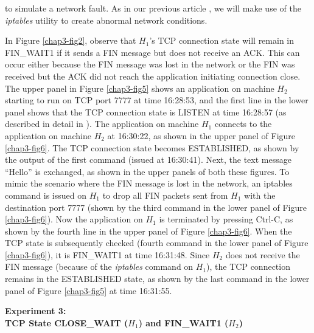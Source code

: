 \begin{multicols}{2}
\noindent
to simulate a network fault. As in our previous article \cite{chap3-key8}, we will make use of the \textit{iptables} utility to create abnormal network conditions.

In Figure \ref{chap3-fig2}, observe that $H_{1}$'s TCP connection state will remain in FIN\_WAIT1 if it sends a FIN message but does not receive an ACK. This can occur either because the FIN message was lost in the network or the FIN was received but the ACK did not reach the application initiating connection close. The upper panel in Figure \ref{chap3-fig5} shows an application on machine $H_{2}$ starting to run on TCP port 7777 at time 16:28:53, and the first line in the lower panel shows that the TCP connection state is LISTEN at time 16:28:57 (as described in detail in \cite{chap3-key8}). The application on machine $H_{1}$ connects to the application on machine $H_{2}$ at 16:30:22, as shown in the upper panel of Figure \ref{chap3-fig6}. The TCP connection state becomes ESTABLISHED, as shown by the output of the first command (issued at 16:30:41). Next, the text message ``Hello'' is exchanged, as shown in the upper panels of both these figures. To mimic the scenario where the FIN message is lost in the network, an iptables command is issued on $H_{1}$ to drop all FIN packets sent from $H_{1}$ with the destination port 7777 (shown by the third command in the lower panel of Figure \ref{chap3-fig6}). Now the application on $H_{1}$ is terminated by pressing Ctrl-C, as shown by the fourth line in the upper panel of Figure \ref{chap3-fig6}. When the TCP state is subsequently checked (fourth command in the lower panel of Figure \ref{chap3-fig6}), it is FIN\_WAIT1 at time 16:31:48. Since $H_{2}$ does not receive the FIN message (because of the \textit{iptables} command on $H_{1}$), the TCP connection remains in the ESTABLISHED state, as shown by the last command in the lower panel of Figure \ref{chap3-fig5} at 	time 16:31:55.

\medskip
\noindent
\textbf{Experiment 3:\\ TCP State CLOSE\_WAIT (\boldmath$H_{1}$) and FIN\_WAIT1 ($H_{2}$)}
\smallskip


\end{multicols}
